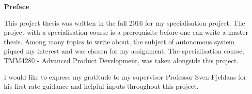 \vspace*{\fill}
{\centering\huge\bfseries Preface \par}
\noindent This project thesis was written in the fall 2016 for my specialisation project. The project with a specialisation course is a prerequisite before one can write a master thesis. Among many topics to write about, the subject of autonomous system piqued my interest and was chosen for my assignment. The specialisation course, TMM4280 - Advanced Product Development, was taken alongside this project.

I would like to express my gratitude to my supervisor Professor Sven Fjeldaas for his first-rate guidance and helpful inputs throughout this project.

\vspace*{\fill}